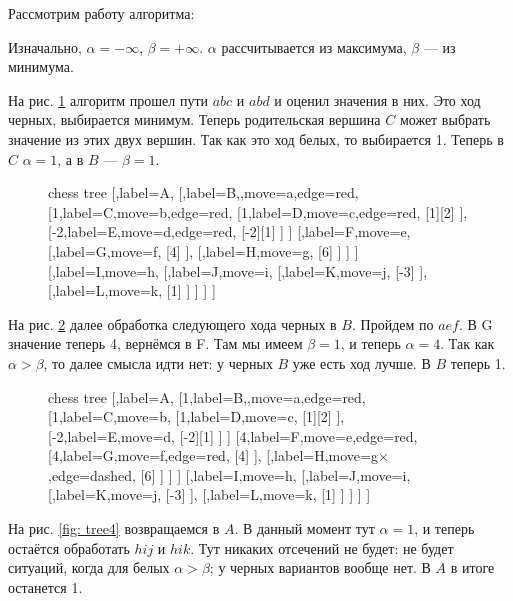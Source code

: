 {	Рассмотрим работу алгоритма:
	
	Изначально, $\alpha=-\infty$, $\beta=+\infty$. $\alpha$ рассчитывается из максимума, $\beta$ --- из минимума.
	
	На рис. \ref{fig: tree2} алгоритм прошел пути $abc$ и $abd$ и оценил значения в них. Это ход черных, выбирается минимум. Теперь родительская вершина $C$ может выбрать значение из этих двух вершин. Так как это ход белых, то выбирается 1. Теперь в $C$ $\alpha=1$, а в $B$ --- $\beta=1$.
	\begin{figure}[h]
		\centering
		\caption{}
		\label{fig: tree2}
		
		\begin{forest}chess tree
			[,label=A,
			[,label=B,,move=a,edge=red,
			[{1},label={C},move=b,edge=red,
			[1,label=D,move=c,edge=red,
			[1][2]
			],
			[-2,label=E,move=d,edge=red,
			[-2][1]
			]
			]
			[,label=F,move=e,
			[,label=G,move=f,
			[4]
			],
			[,label=H,move=g,
			[6]
			]
			]
			]
			[,label=I,move=h,
			[,label=J,move=i,
			[,label=K,move=j,
			[-3]
			],
			[,label=L,move=k,
			[1]
			]
			]	
			]
			]
		\end{forest}
	\end{figure}
	
	На рис. \ref{fig: tree3} далее обработка следующего хода черных в $B$. Пройдем по $aef$. В G значение теперь 4, вернёмся в F. Там мы имеем $\beta=1$, и теперь $\alpha=4$. Так как $\alpha>\beta$, то далее смысла идти нет: у черных $B$ уже есть ход лучше. В $B$ теперь 1.
	
	\begin{figure}[t]
		\centering
		\caption{}
		\label{fig: tree3}
		
		\begin{forest}chess tree
			[,label=A,
			[1,label=B,,move=a,edge=red,
			[{1},label={C},move=b,
			[1,label=D,move=c,
			[1][2]
			],
			[-2,label=E,move=d,
			[-2][1]
			]
			]
			[4,label=F,move=e,edge=red,
			[4,label=G,move=f,edge=red,
			[4]
			],
			[,label=H,move={g$\times$},edge=dashed,
			[6]
			]
			]
			]
			[,label=I,move=h,
			[,label=J,move=i,
			[,label=K,move=j,
			[-3]
			],
			[,label=L,move=k,
			[1]
			]
			]	
			]
			]
		\end{forest}
	\end{figure}

	На рис. \ref{fig: tree4} возвращаемся в $A$. В данный момент тут $\alpha=1$, и теперь остаётся обработать $hij$ и $hik$. Тут никаких отсечений не будет: не будет ситуаций, когда для белых $\alpha>\beta$; у черных вариантов вообще нет. В $A$ в итоге останется 1.
	
}
